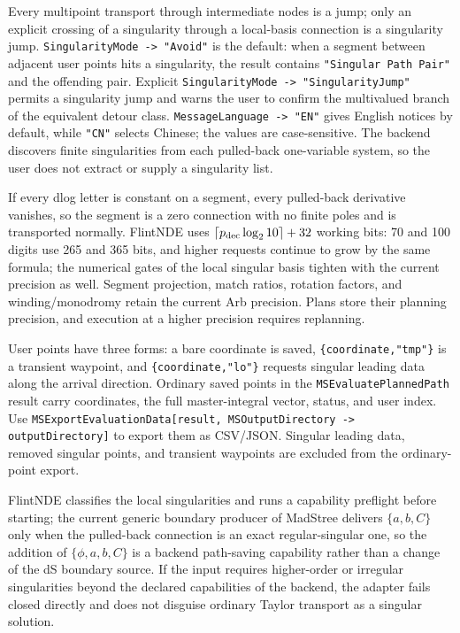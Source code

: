 \documentclass[11pt,a4paper]{article}
\begin{document}
Every multipoint transport through intermediate nodes is a jump; only an explicit crossing
of a singularity through a local-basis connection is a singularity jump.
\texttt{SingularityMode -> "Avoid"} is the default: when a segment between adjacent user
points hits a singularity, the result contains \texttt{"Singular Path Pair"} and the
offending pair. Explicit \texttt{SingularityMode -> "SingularityJump"} permits a
singularity jump and warns the user to confirm the multivalued branch of the equivalent
detour class. \texttt{MessageLanguage -> "EN"} gives English notices by default, while
\texttt{"CN"} selects Chinese; the values are case-sensitive. The backend discovers finite
singularities from each pulled-back one-variable system, so the user does not extract or
supply a singularity list.

If every dlog letter is constant on a segment, every pulled-back derivative vanishes, so the
segment is a zero connection with no finite poles and is transported normally. FlintNDE
uses $\lceil p_{\rm dec}\log_2 10\rceil+32$ working bits: 70 and 100 digits use 265 and
365 bits, and higher requests continue to grow by the same formula; the numerical gates of
the local singular basis tighten with the current precision as well. Segment projection,
match ratios, rotation factors, and winding/monodromy retain the current Arb precision.
Plans store their planning precision, and execution at a higher precision requires
replanning.

User points have three forms: a bare coordinate is saved, \texttt{\{coordinate,"tmp"\}} is
a transient waypoint, and \texttt{\{coordinate,"lo"\}} requests singular leading data along
the arrival direction. Ordinary saved points in the \texttt{MSEvaluatePlannedPath} result
carry coordinates, the full master-integral vector, status, and user index. Use
\texttt{MSExportEvaluationData[result, MSOutputDirectory -> outputDirectory]} to export
them as CSV/JSON. Singular leading data, removed singular points, and transient waypoints
are excluded from the ordinary-point export.

FlintNDE classifies the local singularities and runs a capability preflight before starting; the current generic boundary producer of MadStree delivers $\{a,b,C\}$ only when the pulled-back connection is an exact regular-singular one, so the addition of $\{\phi,a,b,C\}$ is a backend path-saving capability rather than a change of the dS boundary source. If the input requires higher-order or irregular singularities beyond the declared capabilities of the backend, the adapter fails closed directly and does not disguise ordinary Taylor transport as a singular solution.
\end{document}
